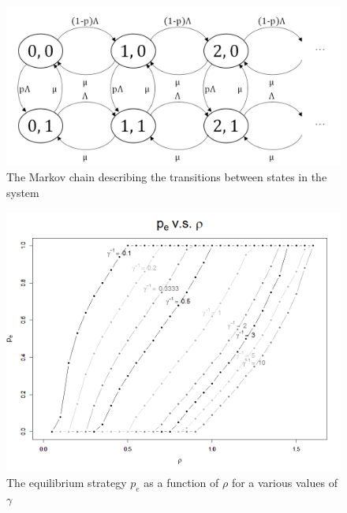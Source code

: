 \documentclass[11pt]{article}
\numberwithin{equation}{section}
\begin{document}
\begin{figure}[h!]
  \centering
    \includegraphics[width=1\textwidth]{Fig_2.png}
    \caption{The Markov chain describing the transitions between states in the system}
    \label{MarkovChain}
\end{figure}

\begin{figure}[h!]
  \centering
    \includegraphics[width=1\textwidth]{peq_vs_rho.png}
    \caption{The equilibrium strategy $p_{e}$ as a function of $\rho$ for a various values of $\gamma$}
    \label{PeqVsRho}
\end{figure}
\end{document}
